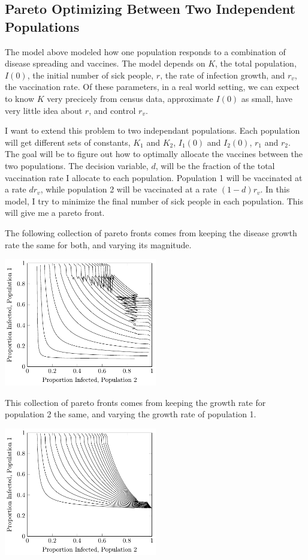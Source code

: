 \documentclass[titlepage]{article}
\begin{document}
\subsection{Pareto Optimizing Between Two Independent Populations}

The model above modeled how one population responds to a combination
	of disease spreading and vaccines.
The model depends on $K$, the total population, $I(0)$, the initial
	number of sick people, $r$, the rate of infection growth,
	and $r_v$, the vaccination rate.
Of these parameters, in a real world setting, we can expect to know $K$
	very precicely from census data, approximate $I(0)$ as small,
	have very little idea about $r$, and control $r_v$.

I want to extend this problem to two independant populations.
Each population will get different sets of constants,
	$K_1$ and $K_2$, $I_1(0)$ and $I_2(0)$, $r_1$ and $r_2$.
The goal will be to figure out how to optimally allocate the
	vaccines between the two populations.
The decision variable, $d$, will be the fraction of the total vaccination
	rate I allocate to each population.
Population 1 will be vaccinated at a rate $d r_v$, while population
	2 will be vaccinated at a rate $(1 - d) r_v$.
In this model, I try to minimize the final number of sick people in
	each population.
This will give me a pareto front.

The following collection of pareto fronts comes from keeping the disease
	growth rate the same for both, and varying its magnitude.

\includegraphics[width=0.5\textwidth]{figures/vaccination-model-same-r-pareto-curves.pdf}

This collection of pareto fronts comes from keeping the growth
	rate for population 2 the same, and varying the growth
	rate of population 1.

\includegraphics[width=0.5\textwidth]{figures/vaccination-model-different-r-pareto-curves.pdf}
\end{document}
